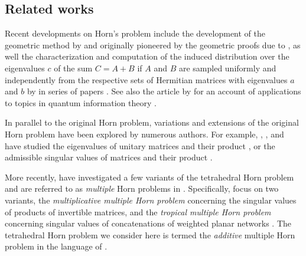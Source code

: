\documentclass[pdflatex, sn-mathphys-num]{sn-jnl} %
\let\oldciteauthor=\citeauthor
\def\citeauthor#1{\hypersetup{citecolor=black}\oldciteauthor{#1}\hypersetup{citecolor=blue}}
\theoremstyle{plain}
\theoremstyle{definition}
\def\hypersetup#1{}%
\newcommand{\ea}{a}
\newcommand{\eb}{b}
\newcommand{\ec}{c}
\begin{document}
\subsection{Related works}
Recent developments on Horn's problem include the development of the geometric method by \citeauthor{sherman2015geometric} \cite{sherman2015geometric} and \citeauthor{berline2018horn} \cite{berline2018horn} originally pioneered by the geometric proofs due to \citeauthor{belkale2002geometric} \cite{belkale2002geometric,belkale2005geometric}, as well the characterization and computation of the induced distribution over the eigenvalues $\ec$ of the sum $C=A+B$ if $A$ and $B$ are sampled uniformly and independently from the respective sets of Hermitian matrices with eigenvalues $\ea$ and $\eb$ by \citeauthor{coquereaux2019revisiting} in series of papers \cite{coquereaux2018orbital,coquereaux2018orbital,coquereaux2019revisiting,zuber2018horn}.
See also the article by \citeauthor{daftuar2005quantum} for an account of applications to topics in quantum information theory \cite{daftuar2005quantum}.

In parallel to the original Horn problem, variations and extensions of the original Horn problem have been explored by numerous authors.
For example, \citeauthor{agnihotri1997eigenvalues}, \citeauthor{belkale2008quantum}, and \cite{belkale2016multiplicative} have studied the eigenvalues of unitary matrices and their product \cite{agnihotri1997eigenvalues,belkale2008quantum,belkale2016multiplicative}, or the admissible singular values of matrices and their product \cite{speyer2005horn,thompson1971eigenvaluesviii,klyachko2000random,alekseev2001linearization}.

More recently, \citeauthor{alekseev2025multiple} have investigated a few variants of the tetrahedral Horn problem and are referred to as \textit{multiple} Horn problems in \cite{alekseev2025multiple}.
Specifically, \citeauthor{alekseev2025multiple} focus on two variants, the \textit{multiplicative multiple Horn problem} concerning the singular values of products of invertible matrices, and the \textit{tropical multiple Horn problem} concerning singular values of concatenations of weighted planar networks \cite{alekseev2025multiple}.
The tetrahedral Horn problem we consider here is termed the \textit{additive} multiple Horn problem in the language of \cite{alekseev2025multiple}.
\end{document}

